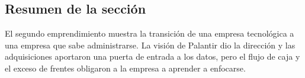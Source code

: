 \subsection{Resumen de la sección}

El segundo emprendimiento muestra la transición de una empresa tecnológica a una empresa que sabe administrarse. La visión de Palantir dio la dirección y las adquisiciones aportaron una puerta de entrada a los datos, pero el flujo de caja y el exceso de frentes obligaron a la empresa a aprender a enfocarse.
